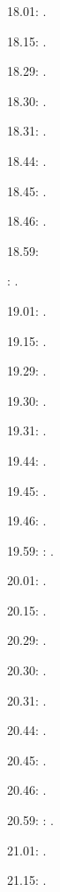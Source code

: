 \documentclass[italian]{article}
\begin{document}
18.01:     . 

18.15:     . 

18.29:     . 

18.30:     .

18.31:     .

18.44:     .

18.45:     .

18.46:     .

18.59:     

:    .

19.01:     . 

19.15:     . 

19.29:     . 

19.30:     .

19.31:     .

19.44:     .

19.45:     .

19.46:     .

19.59:     
:    .

20.01:     . 

20.15:     . 

20.29:     . 

20.30:     .

20.31:     .

20.44:     .

20.45:     .

20.46:     .

20.59:     
:    .

21.01:     . 

21.15:     . 
\end{document}
